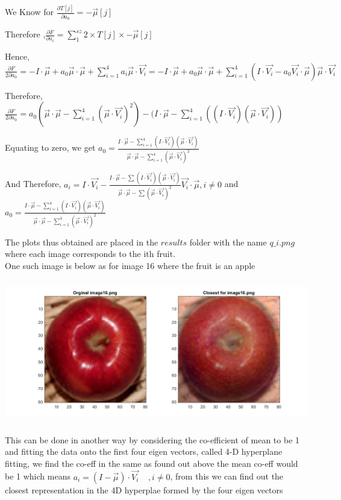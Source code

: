 \documentclass{article}
\begin{document}
We Know for $\frac{\partial T[j]}{\partial a_0} = -\Vec{\mu}[j]$\par 
Therefore ,$\frac{\partial F}{\partial a_i} = \sum_1^{sz} 2\times T[j] \times -\Vec{\mu}[j] $\par
Hence, $\frac{\partial F}{2\partial a_0} = -I\cdot\Vec{\mu}+a_0 \Vec{\mu}\cdot\Vec{\mu} + \sum_{i=1}^4 a_i\Vec{\mu}\cdot\Vec{V_i} = -I\cdot\Vec{\mu}+a_0 \Vec{\mu}\cdot\Vec{\mu} + \sum_{i=1}^4 (I\cdot\Vec{V_i}-a_0 \Vec{V_i}\cdot\Vec{\mu})\Vec{\mu}\cdot\Vec{V_i} $\par 
Therefore, $\frac{\partial F}{2\partial a_0} = a_0(\Vec{\mu}\cdot\Vec{\mu}-\sum_{i=1}^4 {(\Vec{\mu}\cdot\Vec{V_i})}^2) - (I\cdot\Vec{\mu} - \sum_{i=1}^4 ((I\cdot\Vec{V_i})(\Vec{\mu}\cdot\Vec{V_i}) )$\par 
Equating to zero, we get $\boxed{a_0 = \frac{I\cdot\Vec{\mu} - \sum_{i=1}^4 (I\cdot\Vec{V_i})(\Vec{\mu}\cdot\Vec{V_i})}{\Vec{\mu}\cdot\Vec{\mu}-\sum_{i=1}^4 {(\Vec{\mu}\cdot\Vec{V_i})}^2}}$\par 
And Therefore, $a_i =I\cdot\Vec{V_i} - \frac{I\cdot\Vec{\mu} - \sum (I\cdot\Vec{V_i})(\Vec{\mu}\cdot\Vec{V_i})}{\Vec{\mu}\cdot\Vec{\mu}-\sum {(\Vec{\mu}\cdot\Vec{V_i})}^2} \Vec{V_i}\cdot\Vec{\mu} , i\neq 0  $ and $a_0 = \frac{I\cdot\Vec{\mu} - \sum_{i=1}^4 (I\cdot\Vec{V_i})(\Vec{\mu}\cdot\Vec{V_i})}{\Vec{\mu}\cdot\Vec{\mu}-\sum_{i=1}^4 {(\Vec{\mu}\cdot\Vec{V_i})}^2}$\par 
The plots thus obtained are placed in the $results$ folder with the name $q\_i.png$ where each image corresponds to the ith fruit.\\
One such image is below as for image 16 where the fruit is an apple\\
    {\includegraphics[width =16cm, height=7cm]{hw4/q6_16.png}}\\
This can be done in another way by considering the co-efficient of mean to be 1 and fitting the data onto the first four eigen vectors, called 4-D hyperplane fitting, we find the co-eff in the same as found out above the mean co-eff would be 1 which means $\boxed{a_i = (I-\Vec{\mu})\cdot\Vec{V_i}\ \ \ \  \ ,i\neq 0}$, from this we can find out the closest representation in the 4D hyperplae formed by the four eigen vectors
\end{document}
